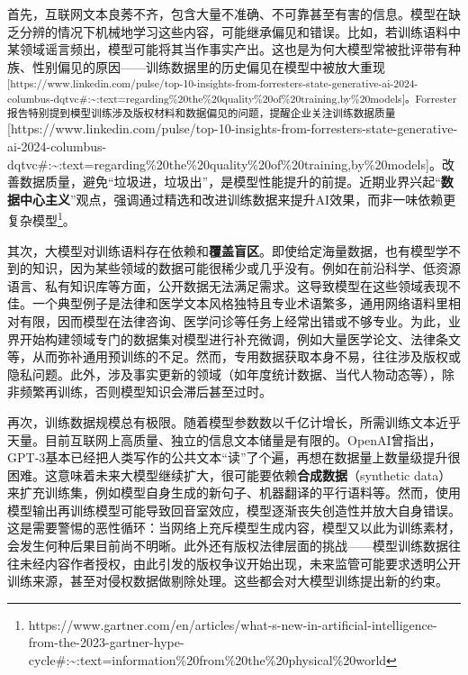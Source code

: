 \documentclass[
  letterpaper,
]{scrbook}
\begin{document}
首先，互联网文本良莠不齐，包含大量不准确、不可靠甚至有害的信息。模型在缺乏分辨的情况下机械地学习这些内容，可能继承偏见和错误。比如，若训练语料中某领域谣言频出，模型可能将其当作事实产出。这也是为何大模型常被批评带有种族、性别偏见的原因------训练数据里的历史偏见在模型中被放大重现\textsuperscript{{[}https://www.linkedin.com/pulse/top-10-insights-from-forresters-state-generative-ai-2024-columbus-dqtvc\#:\textasciitilde:text=regarding\%20the\%20quality\%20of\%20training,by\%20models{]}。Forrester报告特别提到模型训练涉及版权材料和数据偏见的问题，提醒企业关注训练数据质量}{[}https://www.linkedin.com/pulse/top-10-insights-from-forresters-state-generative-ai-2024-columbus-dqtvc\#:\textasciitilde:text=regarding\%20the\%20quality\%20of\%20training,by\%20models{]}。改善数据质量，避免``垃圾进，垃圾出''，是模型性能提升的前提。近期业界兴起``\textbf{数据中心主义}''观点，强调通过精选和改进训练数据来提升AI效果，而非一味依赖更复杂模型\footnote{https://www.gartner.com/en/articles/what-s-new-in-artificial-intelligence-from-the-2023-gartner-hype-cycle\#:\textasciitilde:text=information\%20from\%20the\%20physical\%20world}。

其次，大模型对训练语料存在依赖和\textbf{覆盖盲区}。即使给定海量数据，也有模型学不到的知识，因为某些领域的数据可能很稀少或几乎没有。例如在前沿科学、低资源语言、私有知识库等方面，公开数据无法满足需求。这导致模型在这些领域表现不佳。一个典型例子是法律和医学文本风格独特且专业术语繁多，通用网络语料里相对有限，因而模型在法律咨询、医学问诊等任务上经常出错或不够专业。为此，业界开始构建领域专门的数据集对模型进行补充微调，例如大量医学论文、法律条文等，从而弥补通用预训练的不足。然而，专用数据获取本身不易，往往涉及版权或隐私问题。此外，涉及事实更新的领域（如年度统计数据、当代人物动态等），除非频繁再训练，否则模型知识会滞后甚至过时。

再次，训练数据规模总有极限。随着模型参数数以千亿计增长，所需训练文本近乎天量。目前互联网上高质量、独立的信息文本储量是有限的。OpenAI曾指出，GPT-3基本已经把人类写作的公共文本``读''了个遍，再想在数据量上数量级提升很困难。这意味着未来大模型继续扩大，很可能要依赖\textbf{合成数据}（synthetic
data）来扩充训练集，例如模型自身生成的新句子、机器翻译的平行语料等。然而，使用模型输出再训练模型可能导致回音室效应，模型逐渐丧失创造性并放大自身错误。这是需要警惕的恶性循环：当网络上充斥模型生成内容，模型又以此为训练素材，会发生何种后果目前尚不明晰。此外还有版权法律层面的挑战------模型训练数据往往未经内容作者授权，由此引发的版权争议开始出现，未来监管可能要求透明公开训练来源，甚至对侵权数据做剔除处理。这些都会对大模型训练提出新的约束。
\end{document}
